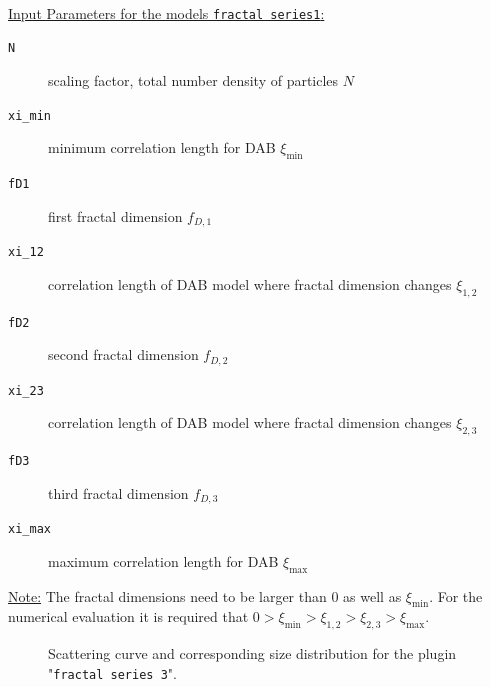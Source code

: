 \hspace{1pt}\\
\uline{Input Parameters for the models \texttt{fractal series1}:}\\
\begin{description}
\item[\texttt{N}] scaling factor, total number density of particles $N$
\item[\texttt{xi\_min}] minimum correlation length for DAB $\xi_\mathrm{min}$
\item[\texttt{fD1}] first fractal dimension $f_{D,1}$
\item[\texttt{xi\_12}] correlation length of DAB model where fractal dimension changes $\xi_{1,2}$
\item[\texttt{fD2}] second fractal dimension $f_{D,2}$
\item[\texttt{xi\_23}] correlation length of DAB model where fractal dimension changes $\xi_{2,3}$
\item[\texttt{fD3}] third fractal dimension $f_{D,3}$
\item[\texttt{xi\_max}] maximum correlation length for DAB $\xi_\mathrm{max}$
\end{description}
\noindent\uline{Note:}
The fractal dimensions need to be larger than 0 as well as $\xi_\mathrm{min}$. For the numerical evaluation it is required that $0>\xi_\mathrm{min}>\xi_{1,2}>\xi_{2,3}>\xi_\mathrm{max}$.

\begin{figure}[htb]
\captionsetup[subfigure]{position=b}
\centering
{}
\hfill
{}
\caption{Scattering curve and corresponding size distribution for the plugin "\texttt{fractal series 3}".}
\end{figure}

